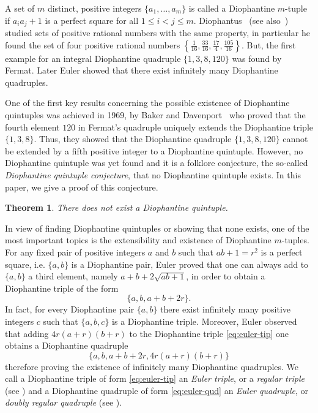 \documentclass{amsart}
\newtheorem{theorem}{Theorem}
\theoremstyle{definition}
\begin{document}
A set of $m$ distinct, positive integers $\{a_1, \dots,  a_m\}$ is called a Diophantine $m$-tuple if $a_i a_j +1$ is a perfect square for all $1 \le i < j \le m$.
Diophantus~\cite{Diophantus} (see also~\cite{Dickson}) studied sets of positive rational numbers with the same property, in particular he found the set of four
positive rational numbers $\left\{\frac{1}{16}, \frac{33}{16}, \frac{17}{4}, \frac{105}{16}\right\}$. But, the first example for an integral Diophantine quadruple $\{1,3,8,120\}$
was found by Fermat. Later Euler showed that there exist infinitely many Diophantine quadruples.

One of the first key results concerning the possible existence of Diophantine
quintuples was achieved in 1969, by Baker and Davenport~\cite{Baker-Davenport:1969} who proved that the fourth element $120$ in Fermat's
quadruple uniquely extends the Diophantine triple  $\{1, 3, 8\}$.
Thus, they showed that the Diophantine quadruple $\{1, 3, 8, 120\}$ cannot be extended by a fifth positive integer to a Diophantine quintuple.
However, no Diophantine quintuple was yet found and it is a folklore conjecture, the so-called {\it Diophantine quintuple conjecture}, that no Diophantine quintuple exists.
In this paper, we give a proof of this conjecture. 

\begin{theorem}\label{thm:main}
There does not exist a Diophantine quintuple.
\end{theorem} 
 
In view of finding Diophantine quintuples or showing that none exists, one of the most important topics is the extensibility and existence of Diophantine $m$-tuples.
For any fixed pair of positive integers $a$ and $b$ such that $ab+1=r^2$ is a perfect square, i.e. $\{a, b\}$ is a Diophantine pair,
Euler proved that one can always add to $\{a, b\}$ a third element, namely $a+b+2\sqrt{ab+1}$, in order to obtain a Diophantine triple of the form
\begin{equation}\label{eq:euler-tip}
\{a,b,a+b+2r\}.
\end{equation}
In fact, for every Diophantine pair $\{a, b\}$ there exist infinitely many positive integers $c$ such that $\{a, b, c\}$ is a Diophantine triple.
Moreover, Euler observed that adding $4r(a+r)(b+r)$ to the Diophantine triple \eqref{eq:euler-tip} one obtains a Diophantine quadruple 
\begin{equation}\label{eq:euler-qud}
\{a,b,a+b+2r, 4r(a+r)(b+r)\}
\end{equation}
therefore proving the existence of infinitely many Diophantine quadruples. We call a Diophantine triple of form \eqref{eq:euler-tip}
an \emph{Euler triple}, or a \emph{regular triple} (see \cite{Fujita-Miyazaki}) and a Diophantine quadruple of form
\eqref{eq:euler-qud} an \emph{Euler quadruple}, or \emph{doubly regular quadruple} (see \cite{Martin-Sitar}).
\end{document}
